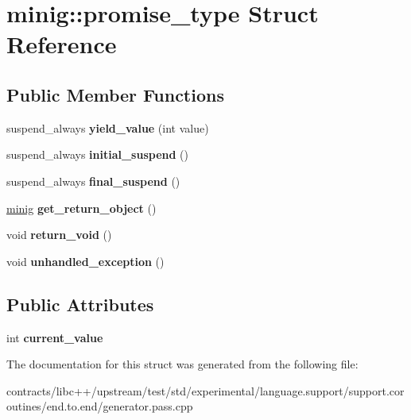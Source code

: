 \hypertarget{structminig_1_1promise__type}{}\section{minig\+:\+:promise\+\_\+type Struct Reference}
\label{structminig_1_1promise__type}
\subsection*{Public Member Functions}
\begin{DoxyCompactItemize}
\item 
\mbox{\label{structminig_1_1promise__type_a8a83a0d233a1a8cb2397d99213598c72}} 
suspend\+\_\+always {\bfseries yield\+\_\+value} (int value)
\item 
\mbox{\label{structminig_1_1promise__type_ab172046817f4993fcbcd756e29276dee}} 
suspend\+\_\+always {\bfseries initial\+\_\+suspend} ()
\item 
\mbox{\label{structminig_1_1promise__type_a71c9fb02e0ed1d6f0e019f3da2c77669}} 
suspend\+\_\+always {\bfseries final\+\_\+suspend} ()
\item 
\mbox{\label{structminig_1_1promise__type_a2e4112a0bac0e6bb62cb1a0569fedac9}} 
\mbox{\hyperlink{structminig}{minig}} {\bfseries get\+\_\+return\+\_\+object} ()
\item 
\mbox{\label{structminig_1_1promise__type_a6668bafd07937a6150d6fca0ff317b4a}} 
void {\bfseries return\+\_\+void} ()
\item 
\mbox{\label{structminig_1_1promise__type_a84895792c954029751a44b339ccef26b}} 
void {\bfseries unhandled\+\_\+exception} ()
\end{DoxyCompactItemize}
\subsection*{Public Attributes}
\begin{DoxyCompactItemize}
\item 
\mbox{\label{structminig_1_1promise__type_adcb6f1c2ad2c7691a3c8ed159c1e3bfd}} 
int {\bfseries current\+\_\+value}
\end{DoxyCompactItemize}


The documentation for this struct was generated from the following file\+:\begin{DoxyCompactItemize}
\item 
contracts/libc++/upstream/test/std/experimental/language.\+support/support.\+coroutines/end.\+to.\+end/generator.\+pass.\+cpp\end{DoxyCompactItemize}
